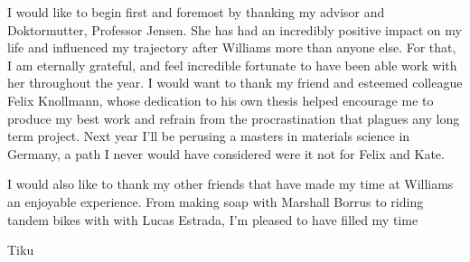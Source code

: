 
I would like to begin first and foremost by thanking my advisor and Doktormutter, Professor Jensen. She has had an incredibly positive impact on my life and influenced my trajectory after Williams more than anyone else. For that, I am eternally grateful, and feel incredible fortunate to have been able work with her throughout the year. I would want to thank my friend and esteemed colleague Felix Knollmann, whose dedication to his own thesis helped encourage me to produce my best work and refrain from the procrastination that plagues any long term project. Next year I'll be perusing a masters in materials science in Germany, a path I never would have considered were it not for Felix and Kate. 

I would also like to thank my other friends that have made my time at Williams an enjoyable experience. From making soap with Marshall Borrus to riding tandem bikes with with Lucas Estrada, I'm pleased to have filled my time 

Tiku



